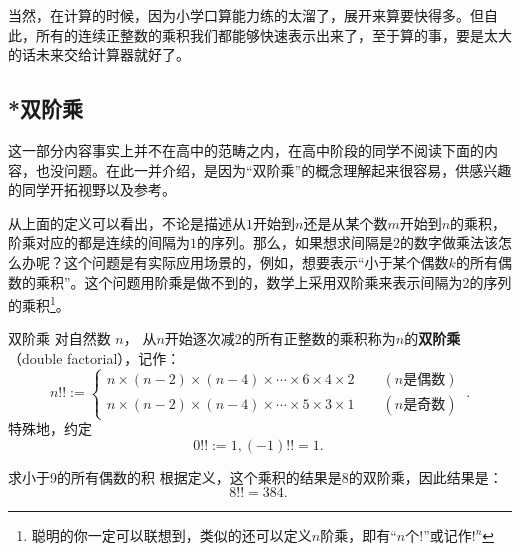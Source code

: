 当然，在计算的时候，因为小学口算能力练的太溜了，展开来算要快得多。但自此，所有的连续正整数的乘积我们都能够快速表示出来了，至于算的事，要是太大的话未来交给计算器就好了。

\subsection{*双阶乘}

这一部分内容事实上并不在高中的范畴之内，在高中阶段的同学不阅读下面的内容，也没问题。在此一并介绍，是因为“双阶乘”的概念理解起来很容易，供感兴趣的同学开拓视野以及参考。

从上面的定义可以看出，不论是描述从$1$开始到$n$还是从某个数$m$开始到$n$的乘积，阶乘对应的都是连续的间隔为$1$的序列。那么，如果想求间隔是$2$的数字做乘法该怎么办呢？这个问题是有实际应用场景的，例如，想要表示“小于某个偶数$k$的所有偶数的乘积”。这个问题用阶乘是做不到的，数学上采用双阶乘来表示间隔为2的序列的乘积\footnote{聪明的你一定可以联想到，类似的还可以定义$n$阶乘，即有“$n$个$!$”或记作$!^n$}。

\begin{definition}{双阶乘}
对自然数 $n$， 从$n$开始逐次减$2$的所有正整数的乘积称为$n$的\textbf{双阶乘}（double factorial），记作：
\begin{equation}
n!! :=
\begin{cases}
n \times (n-2) \times (n-4)\times \cdots \times6\times4\times 2\qquad (n\text{是偶数})\\  
n \times (n-2) \times (n-4)\times \cdots \times5\times3\times 1\qquad (n\text{是奇数})
\end{cases} ~.
\end{equation}
特殊地，约定
\begin{equation}
0!! := 1,(-1)!!=1.~
\end{equation}
\end{definition}
\begin{example}{求小于9的所有偶数的积}
根据定义，这个乘积的结果是8的双阶乘，因此结果是：
$$8!!=384.~$$
\end{example}
